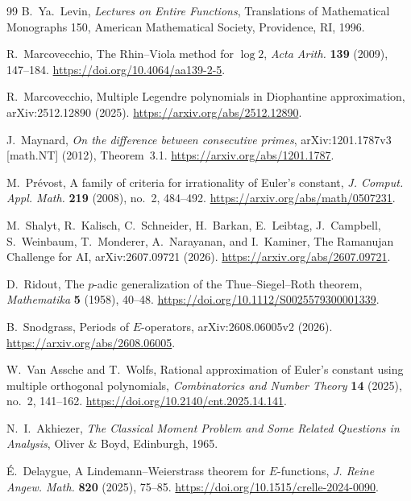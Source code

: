 \documentclass[11pt]{article}
\theoremstyle{keio}
\theoremstyle{definition}
\theoremstyle{remark}
\begin{document}
\begin{thebibliography}{99}
B.~Ya.~Levin,
\newblock \emph{Lectures on Entire Functions},
\newblock Translations of Mathematical Monographs 150,
American Mathematical Society, Providence, RI, 1996.

R.~Marcovecchio,
\newblock The Rhin--Viola method for \(\log 2\),
\newblock \emph{Acta Arith.} \textbf{139} (2009), 147--184.
\newblock \url{https://doi.org/10.4064/aa139-2-5}.

R.~Marcovecchio,
\newblock Multiple Legendre polynomials in Diophantine approximation,
\newblock arXiv:2512.12890 (2025).
\newblock \url{https://arxiv.org/abs/2512.12890}.

J.~Maynard,
\newblock \emph{On the difference between consecutive primes},
\newblock arXiv:1201.1787v3 [math.NT] (2012), Theorem~3.1.
\newblock \url{https://arxiv.org/abs/1201.1787}.

M.~Pr\'evost,
\newblock A family of criteria for irrationality of Euler's constant,
\newblock \emph{J. Comput. Appl. Math.} \textbf{219} (2008), no.~2,
484--492.
\newblock \url{https://arxiv.org/abs/math/0507231}.

M.~Shalyt, R.~Kalisch, C.~Schneider, H.~Barkan, E.~Leibtag,
J.~Campbell, S.~Weinbaum, T.~Monderer, A.~Narayanan, and I.~Kaminer,
\newblock The Ramanujan Challenge for AI,
\newblock arXiv:2607.09721 (2026).
\newblock \url{https://arxiv.org/abs/2607.09721}.

D.~Ridout,
\newblock The \(p\)-adic generalization of the Thue--Siegel--Roth theorem,
\newblock \emph{Mathematika} \textbf{5} (1958), 40--48.
\newblock \url{https://doi.org/10.1112/S0025579300001339}.

B.~Snodgrass,
\newblock Periods of \(E\)-operators,
\newblock arXiv:2608.06005v2 (2026).
\newblock \url{https://arxiv.org/abs/2608.06005}.

W.~Van Assche and T.~Wolfs,
\newblock Rational approximation of Euler's constant using multiple
orthogonal polynomials,
\newblock \emph{Combinatorics and Number Theory} \textbf{14} (2025),
no.~2, 141--162.
\newblock \url{https://doi.org/10.2140/cnt.2025.14.141}.

N.~I.~Akhiezer,
\newblock \emph{The Classical Moment Problem and Some Related Questions in
Analysis},
\newblock Oliver \& Boyd, Edinburgh, 1965.

\'E.~Delaygue,
\newblock A Lindemann--Weierstrass theorem for \(E\)-functions,
\newblock \emph{J. Reine Angew. Math.} \textbf{820} (2025), 75--85.
\newblock \url{https://doi.org/10.1515/crelle-2024-0090}.


\end{thebibliography}
\end{document}
